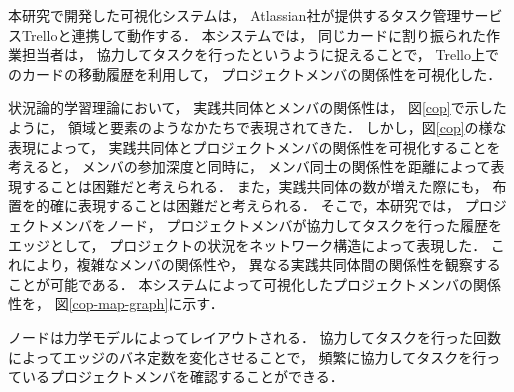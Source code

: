 

本研究で開発した可視化システムは，
Atlassian社が提供するタスク管理サービスTrello\cite{trello}と連携して動作する．
本システムでは，
同じカードに割り振られた作業担当者は，
協力してタスクを行ったというように捉えることで，
Trello上でのカードの移動履歴を利用して，
プロジェクトメンバの関係性を可視化した．

状況論的学習理論において，
実践共同体とメンバの関係性は，
図\ref{cop}で示したように，
領域と要素のようなかたちで表現されてきた．
しかし，図\ref{cop}の様な表現によって，
実践共同体とプロジェクトメンバの関係性を可視化することを考えると，
メンバの参加深度と同時に，
メンバ同士の関係性を距離によって表現することは困難だと考えられる．
また，実践共同体の数が増えた際にも，
布置を的確に表現することは困難だと考えられる．
そこで，本研究では，
プロジェクトメンバをノード，
プロジェクトメンバが協力してタスクを行った履歴をエッジとして，
プロジェクトの状況をネットワーク構造によって表現した．
これにより，複雑なメンバの関係性や，
異なる実践共同体間の関係性を観察することが可能である．
本システムによって可視化したプロジェクトメンバの関係性を，
図\ref{cop-map-graph}に示す．

ノードは力学モデルによってレイアウトされる．
協力してタスクを行った回数によってエッジのバネ定数を変化させることで，
頻繁に協力してタスクを行っているプロジェクトメンバを確認することができる．

